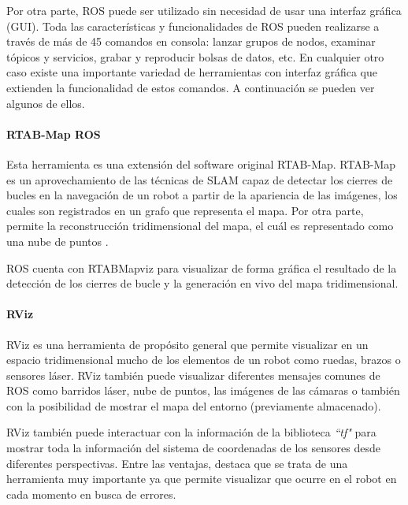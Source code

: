 Por otra parte, ROS puede ser utilizado sin necesidad de usar una interfaz
gráfica (GUI). Toda las características y funcionalidades de ROS pueden
realizarse a través de más de 45 comandos en consola: lanzar grupos de nodos,
examinar tópicos y servicios, grabar y reproducir bolsas de datos, etc. En
cualquier otro caso existe una importante variedad de herramientas con interfaz
gráfica que extienden la funcionalidad de estos comandos. A continuación se
pueden ver algunos de ellos.

\paragraph{RTAB-Map ROS} \hspace{0pt}

Esta herramienta es una extensión del software original RTAB-Map. RTAB-Map
es un aprovechamiento de las técnicas de SLAM capaz de detectar los cierres de
bucles en la navegación de un robot a partir de la apariencia de las imágenes,
los cuales son registrados en un grafo que representa el mapa. Por otra parte,
permite la reconstrucción tridimensional del mapa, el cuál es representado como
una nube de puntos \cite{RTABMap}. 

ROS cuenta con RTABMapviz para visualizar de forma gráfica el resultado de la
detección de los cierres de bucle y la generación en vivo del mapa
tridimensional.

\paragraph{RViz} \hspace{0pt}

RViz es una herramienta de propósito general que permite visualizar en un
espacio tridimensional mucho de los elementos de un robot como ruedas, brazos o
sensores láser. RViz también puede visualizar diferentes mensajes comunes de ROS
como barridos láser, nube de puntos, las imágenes de las cámaras o también con
la posibilidad de mostrar el mapa del entorno (previamente almacenado).

RViz también puede interactuar con la información de la biblioteca
\textit{``tf"} para mostrar toda la información del sistema de coordenadas de
los sensores desde diferentes perspectivas. Entre las ventajas, destaca que se
trata de una herramienta muy importante ya que permite visualizar que ocurre en
el robot en cada momento en busca de errores.

